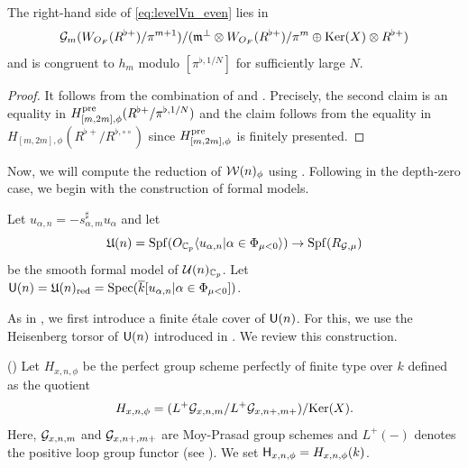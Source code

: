 \documentclass[12pt,reqno]{amsart}
\begin{document}
\begin{prop} \label{prop:levelVn_even_modulo}
    The right-hand side of \eqref{eq:levelVn_even} lies in 
    \[
        {\mathcal{G}}_m(W_{O_F}(R^{\flat +}) / \pi^{m + 1}) / ({\mathfrak{m}}^\perp \otimes W_{O_F}(R^{\flat +}) / \pi^m \oplus {\operatorname{Ker}}(X) \otimes R^{\flat +})
    \]
    and is congruent to $h_m$ modulo $[\pi^{\flat,1/N}]$ for sufficiently large $N$. 
\end{prop}
\begin{proof}
    It follows from the combination of  and . Precisely, the second claim is an equality in $H_{[m, 2m], \phi}^{\operatorname{pre}}(R^{\flat+} / \pi^{\flat, 1 / N})$ and the claim follows from the equality in $H_{[m, 2m], \phi}(R^{\flat+} / R^{\flat, \circ \circ})$ since $H_{[m, 2m], \phi}^{\operatorname{pre}}$ is finitely presented. 
\end{proof}

Now, we will compute the reduction of ${\mathcal{W}}(n)_\phi$ using . Following \cite[Theorem 3.16]{Tak25z} in the depth-zero case, we begin with the construction of formal models. 

\begin{defi}
    Let $u_{\alpha,n} = - s^\sharp_{\alpha, m} u_\alpha$ and let 
    \[
        {\mathfrak{U}}(n) = {\operatorname{Spf}}(O_{\mathbb{C}_p}\langle u_{\alpha, n} \vert \alpha \in \Phi_{\mu < 0} \rangle) \to {\operatorname{Spf}}(R_{{\mathcal{G}}, \mu}) 
    \]
    be the smooth formal model of ${\mathcal{U}}(n)_{\mathbb{C}_p}$. Let ${\mathsf{U}}(n) = {\mathfrak{U}}(n)_{\operatorname{red}} = {\operatorname{Spec}}({\overline{k}}[u_{\alpha, n} \vert \alpha \in \Phi_{\mu < 0}])$. 
\end{defi}

As in , we first introduce a finite \'{e}tale cover of ${\mathsf{U}}(n)$. For this, we use the Heisenberg torsor of ${\mathsf{U}}(n)$ introduced in \cite[Definition 5.2]{Tak26_Yu}. We review this construction. 

\begin{defi}\textup{(\cite[Definition 2.11]{Tak26_Yu})} \label{defi:Heisenberg_group_scheme}
    Let $H_{x, n, \phi}$ be the perfect group scheme perfectly of finite type over $k$ defined as the quotient
    \[
        H_{x, n, \phi} = (L^+{\mathcal{G}}_{x, n, m} / L^+ {\mathcal{G}}_{x, n+, m+}) / {\operatorname{Ker}}(X).     
    \]
    Here, ${\mathcal{G}}_{x, n, m}$ and ${\mathcal{G}}_{x, n+, m+}$ are Moy-Prasad group schemes and $L^+(-)$ denotes the positive loop group functor (see \cite[Definition 2.4]{Tak26_Yu}). We set ${\mathsf{H}}_{x, n, \phi} = H_{x, n, \phi}(k)$. 
\end{defi}
\end{document}
